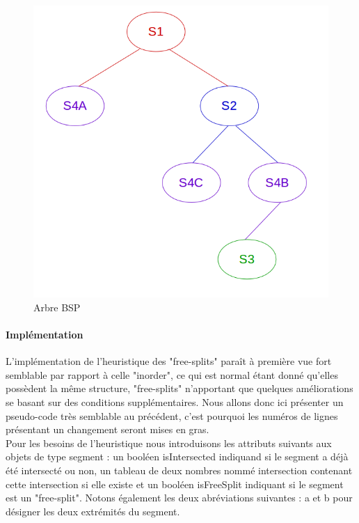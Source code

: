 \documentclass[11pt,a4paper]{article}
\theoremstyle{definition}
\theoremstyle{remark}
\begin{document}
\begin{figure}[!h]
\centering
\includegraphics[scale=0.4]{free_splits_3.png}
\caption{Arbre BSP}
\label{split_bsp}
\end{figure}

\paragraph{Implémentation}

L'implémentation de l'heuristique des "free-splits" paraît à première vue fort semblable par rapport à celle "inorder", ce qui est normal étant donné qu'elles possèdent la même structure, "free-splits" n'apportant que quelques améliorations se basant sur des conditions supplémentaires. Nous allons donc ici présenter un pseudo-code très semblable au précédent, c'est pourquoi les numéros de lignes présentant un changement seront mises en gras.\\

Pour les besoins de l'heuristique nous introduisons les attributs suivants aux objets de type segment : un booléen isIntersected indiquand si le segment a déjà été intersecté ou non, un tableau de deux nombres nommé intersection contenant cette intersection si elle existe et un booléen isFreeSplit indiquant si le segment est un "free-split". Notons également les deux abréviations suivantes : a et b pour désigner les deux extrémités du segment.\\
\end{document}

